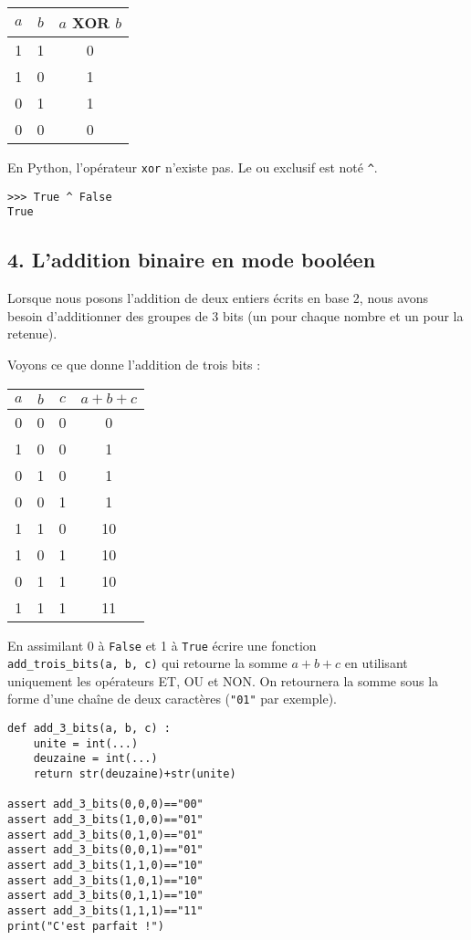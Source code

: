 \documentclass[11pt,a4paper]{article}
\newenvironment{exercice}[1]{\begin{tcolorbox}[title= {\color{YellowGreen} \faQuestion}~~\textbf{Exercice #1}, colframe=YellowGreen, colback=white, colbacktitle=YellowGreen!15!white, coltitle=black, boxrule=0.1mm, titlerule=0mm]}{\end{tcolorbox}}
\begin{document}
\begin{longtable}[]{@{}ccc@{}}
\toprule
\(a\) & \(b\) & \(a\) XOR \(b\)\tabularnewline
\midrule
\endhead
1 & 1 & 0\tabularnewline
1 & 0 & 1\tabularnewline
0 & 1 & 1\tabularnewline
0 & 0 & 0\tabularnewline
\bottomrule
\end{longtable}

En Python, l'opérateur \texttt{xor} n'existe pas. Le ou exclusif est
noté \texttt{\^{}}.

\begin{verbatim} 
>>> True ^ False
True
\end{verbatim}
 

\hypertarget{laddition-binaire-en-mode-booluxe9en}{%
\subsection*{4. L'addition binaire en mode
booléen}\label{laddition-binaire-en-mode-booluxe9en}}

Lorsque nous posons l'addition de deux entiers écrits en base 2, nous
avons besoin d'additionner des groupes de 3 bits (un pour chaque nombre
et un pour la retenue).

Voyons ce que donne l'addition de trois bits :

\begin{longtable}[]{@{}cccc@{}}
\toprule
\(a\) & \(b\) & \(c\) & \(a+b+c\)\tabularnewline
\midrule
\endhead
0 & 0 & 0 & 0\tabularnewline
1 & 0 & 0 & 1\tabularnewline
0 & 1 & 0 & 1\tabularnewline
0 & 0 & 1 & 1\tabularnewline
1 & 1 & 0 & 10\tabularnewline
1 & 0 & 1 & 10\tabularnewline
0 & 1 & 1 & 10\tabularnewline
1 & 1 & 1 & 11\tabularnewline
\bottomrule
\end{longtable}

\begin{exercice}{}
En assimilant 0 à \texttt{False} et 1 à
\texttt{True} écrire une fonction \texttt{add\_trois\_bits(a,\ b,\ c)}
qui retourne la somme \(a+b+c\) en utilisant uniquement les opérateurs
ET, OU et NON. On retournera la somme sous la forme d'une chaîne de deux
caractères (\texttt{"01"} par exemple).

\begin{verbatim}
def add_3_bits(a, b, c) :
    unite = int(...)
    deuzaine = int(...)
    return str(deuzaine)+str(unite)

assert add_3_bits(0,0,0)=="00"
assert add_3_bits(1,0,0)=="01"
assert add_3_bits(0,1,0)=="01"
assert add_3_bits(0,0,1)=="01"
assert add_3_bits(1,1,0)=="10"
assert add_3_bits(1,0,1)=="10"
assert add_3_bits(0,1,1)=="10"
assert add_3_bits(1,1,1)=="11"
print("C'est parfait !")
\end{verbatim}
 
\end{exercice}
\end{document}
